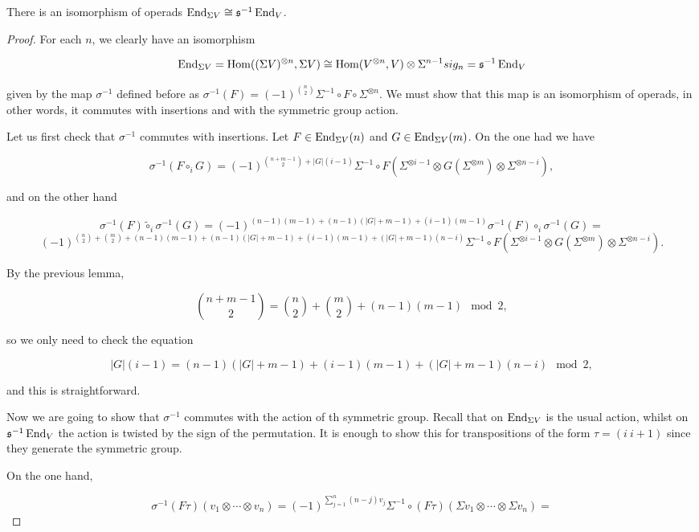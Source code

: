 \documentclass[twoside]{article}
\begin{document}
\begin{theorem}
There is an isomorphism of operads $\operatorname{End}_{\Sigma V}\cong \mathfrak{s}^{-1}\operatorname{End}_V$.
\end{theorem}
\begin{proof}
For each $n$, we clearly have an isomorphism 

$$\operatorname{End}_{\Sigma V}=\operatorname{Hom}((\Sigma V)^{\otimes n},\Sigma V)\cong\operatorname{Hom}(V^{\otimes n},V)\otimes \Sigma^{n-1}sig_n= \mathfrak{s}^{-1}\operatorname{End}_V$$

given by the map $\sigma^{-1}$ defined before as $\sigma^{-1}(F)=(-1)^{\binom{n}{2}}\Sigma^{-1}\circ F\circ\Sigma^{\otimes n}$. We must show that this map is an isomorphism of operads, in other words, it commutes with insertions and with the symmetric group action.

Let us first check that $\sigma^{-1}$ commutes with insertions. Let $F\in \operatorname{End}_{\Sigma V}(n)$ and $G\in \operatorname{End}_{\Sigma V}(m)$. On the one had we have 

$$\sigma^{-1}(F\circ_i G)=(-1)^{\binom{n+m-1}{2}+|G|(i-1)}\Sigma^{-1}\circ F(\Sigma^{\otimes i-1}\otimes G(\Sigma^{\otimes m})\otimes\Sigma^{\otimes n-i}),$$

and on the other hand

$$\sigma^{-1}(F)\tilde{\circ}_i\sigma^{-1}(G)=(-1)^{(n-1)(m-1)+(n-1)(|G|+m-1)+(i-1)(m-1)}\sigma^{-1}(F)\circ_i\sigma^{-1}(G)=$$
$$(-1)^{\binom{n}{2}+\binom{m}{2}+(n-1)(m-1)+(n-1)(|G|+m-1)+(i-1)(m-1)+(|G|+m-1)(n-i)}\Sigma^{-1}\circ F(\Sigma^{\otimes i-1}\otimes G(\Sigma^{\otimes m})\otimes\Sigma^{\otimes n-i}).$$

By the previous lemma, 

$$\binom{n+m-1}{2}=\binom{n}{2}+\binom{m}{2}+(n-1)(m-1)\mod 2,$$

so we only need to check the equation

$$|G|(i-1)=(n-1)(|G|+m-1)+(i-1)(m-1)+(|G|+m-1)(n-i)\mod 2,$$

and this is straightforward.

Now we are going to show that $\sigma^{-1}$ commutes with the action of th symmetric group. Recall that on $\operatorname{End}_{\Sigma V}$ is the usual action, whilst on $\mathfrak{s}^{-1}\operatorname{End}_V$ the action is twisted by the sign of the permutation. It is enough to show this for transpositions of the form $\tau=(i\ i+1)$ since they generate the symmetric group.

On the one hand, 

$$\sigma^{-1}(F\tau)(v_1\otimes\cdots\otimes v_n)=(-1)^{\sum_{j=1}^n (n-j)v_j}\Sigma^{-1}\circ (F\tau)(\Sigma v_1\otimes\cdots\otimes \Sigma v_n)=$$


\end{proof}
\end{document}
